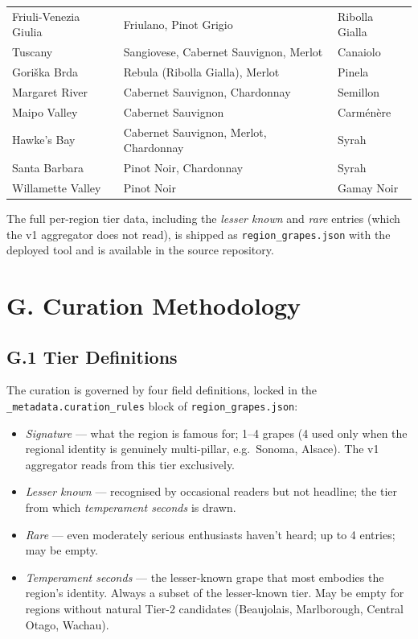 \documentclass[11pt]{article}
\begin{document}
\begin{small}
\begin{longtable}{p{3.5cm} p{6cm} p{3cm}}
Friuli-Venezia Giulia & Friulano, Pinot Grigio                                      & Ribolla Gialla \\
Tuscany              & Sangiovese, Cabernet Sauvignon, Merlot                       & Canaiolo \\
Gori\v{s}ka Brda     & Rebula (Ribolla Gialla), Merlot                              & Pinela \\
Margaret River       & Cabernet Sauvignon, Chardonnay                               & Semillon \\
Maipo Valley         & Cabernet Sauvignon                                           & Carm\'en\`ere \\
Hawke's Bay          & Cabernet Sauvignon, Merlot, Chardonnay                       & Syrah \\
Santa Barbara        & Pinot Noir, Chardonnay                                       & Syrah \\
Willamette Valley    & Pinot Noir                                                   & Gamay Noir \\
\bottomrule
\end{longtable}
\end{small}

The full per-region tier data, including the \emph{lesser known} and \emph{rare} entries (which the v1 aggregator does not read), is shipped as \texttt{region\_grapes.json} with the deployed tool and is available in the source repository.

\section*{G. Curation Methodology}

\subsection*{G.1 Tier Definitions}

The curation is governed by four field definitions, locked in the \texttt{\_metadata.curation\_rules} block of \texttt{region\_grapes.json}:

\begin{itemize}[leftmargin=2em,itemsep=0.1em]
\item \emph{Signature} --- what the region is famous for; 1--4 grapes (4 used only when the regional identity is genuinely multi-pillar, e.g.\ Sonoma, Alsace). The v1 aggregator reads from this tier exclusively.
\item \emph{Lesser known} --- recognised by occasional readers but not headline; the tier from which \emph{temperament seconds} is drawn.
\item \emph{Rare} --- even moderately serious enthusiasts haven't heard; up to 4 entries; may be empty.
\item \emph{Temperament seconds} --- the lesser-known grape that most embodies the region's identity. Always a subset of the lesser-known tier. May be empty for regions without natural Tier-2 candidates (Beaujolais, Marlborough, Central Otago, Wachau).
\end{itemize}
\end{document}
